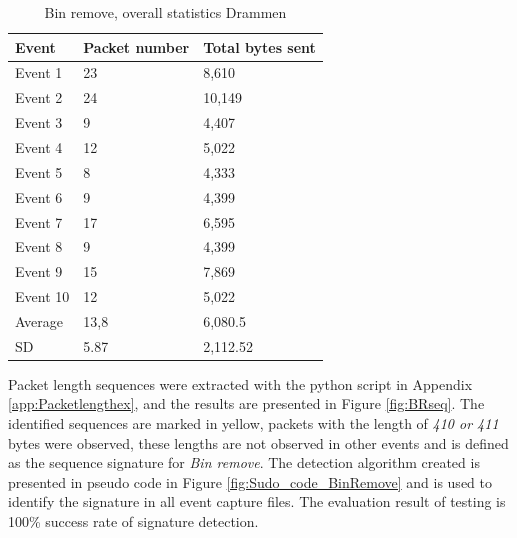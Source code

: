 \begin{table}[H]
\centering
\caption{Bin remove, overall statistics Drammen }
\label{tab:BRoverallDRA}
\begin{tabular}{|l|l|l|}
\hline
\textbf{Event} & \textbf{Packet number} & \textbf{Total bytes sent} \\ \hline
Event 1        & 23                     & 8,610                      \\ \hline
Event 2        & 24                     & 10,149                     \\ \hline
Event 3        & 9                      & 4,407                      \\ \hline
Event 4        & 12                     & 5,022                      \\ \hline
Event 5        & 8                      & 4,333                      \\ \hline
Event 6        & 9                      & 4,399                      \\ \hline
Event 7        & 17                     & 6,595                      \\ \hline
Event 8        & 9                      & 4,399                      \\ \hline
Event 9        & 15                     & 7,869                      \\ \hline
Event 10       & 12                     & 5,022                      \\ \hline
Average        & 13,8                   & 6,080.5                    \\ \hline
SD        & 5.87
       & 2,112.52               \\ \hline
\end{tabular}
\end{table}

Packet length sequences were extracted with the python script in Appendix \ref{app:Packetlengthex}, and the results are presented in Figure \ref{fig:BRseq}. The identified sequences are marked in yellow, packets with the length of \textit{410 or 411} bytes were observed, these lengths are not observed in other events and is defined as the sequence signature for \textit{Bin remove}. The detection algorithm created is presented in pseudo code in Figure \ref{fig:Sudo_code_BinRemove} and is used to identify the signature in all event capture files. The evaluation result of testing is 100\% success rate of signature detection.   

